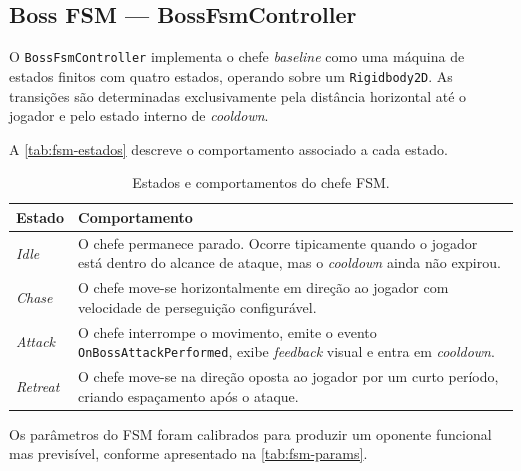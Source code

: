 \subsection{Boss FSM --- BossFsmController}
\label{subsec:boss-fsm-impl}

O \texttt{BossFsmController} implementa o chefe \textit{baseline}
como uma máquina de estados finitos com quatro estados, operando sobre um
\texttt{Rigidbody2D}. As transições são determinadas exclusivamente pela
distância horizontal até o jogador e pelo estado interno de
\textit{cooldown}.

A \autoref{tab:fsm-estados} descreve o comportamento associado a cada estado.

\begin{table}[htb]
    \centering
    \caption{Estados e comportamentos do chefe FSM.}
    \label{tab:fsm-estados}
    \begin{tabular}{l p{10cm}}
        \toprule
        \textbf{Estado}       & \textbf{Comportamento} \\
        \midrule
        \textit{Idle}         & O chefe permanece parado. Ocorre tipicamente
                                quando o jogador está dentro do alcance de
                                ataque, mas o \textit{cooldown} ainda não
                                expirou. \\
        \addlinespace
        \textit{Chase}        & O chefe move-se horizontalmente em direção ao
                                jogador com velocidade de perseguição
                                configurável. \\
        \addlinespace
        \textit{Attack}       & O chefe interrompe o movimento, emite o evento
                                \texttt{OnBossAttackPerformed}, exibe
                                \textit{feedback} visual e entra em
                                \textit{cooldown}. \\
        \addlinespace
        \textit{Retreat}      & O chefe move-se na direção oposta ao jogador
                                por um curto período, criando espaçamento
                                após o ataque. \\
        \bottomrule
    \end{tabular}
\end{table}

Os parâmetros do FSM foram calibrados para produzir um oponente funcional mas
previsível, conforme apresentado na \autoref{tab:fsm-params}.

